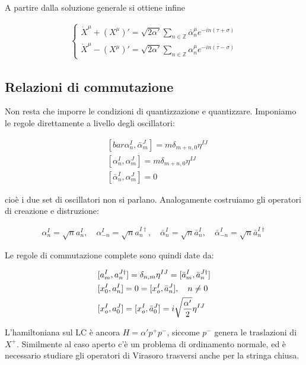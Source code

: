 \documentclass{report}
\begin{document}
A partire dalla soluzione generale si ottiene infine 

\begin{align}
    \begin{cases}
        \dot{X}^\mu + (X^\mu)' = \sqrt{2\alpha'}\sum_{n\in \mathbb{Z}}\bar{\alpha}_n^\mu e^{-in(\tau + \sigma)} \\ 
        \dot{X}^\mu - (X^\mu)' = \sqrt{2\alpha'}\sum_{n\in \mathbb{Z}}\alpha_n^\mu e^{-in(\tau - \sigma)}
    \end{cases}
\end{align}

\subsection{Relazioni di commutazione}

Non resta che imporre le condizioni di quantizzazione e quantizzare. Imponiamo le regole direttamente a livello degli oscillatori: 

\begin{align}
    &[bar{\alpha}_n^I, \bar{\alpha}_m^J] = m \delta_{m+n, 0}\eta^{IJ} \\
    &[\alpha_n^I, \alpha_m^J] = m \delta_{m+n, 0}\eta^{IJ} \\
    &[\bar{\alpha}_n^I, \alpha_m^J]  = 0  
\end{align}

cioè i due set di oscillatori non si parlano. Analogamente costruiamo gli operatori di creazione e distruzione: 

\begin{align}
    \alpha^I_n = \sqrt{n}a_n^I, \quad \alpha^I_{-n} = \sqrt{n}a_n^{I\dagger}, \quad \bar{\alpha}^I_n = \sqrt{n}\bar{a}_n^I, \quad \bar{\alpha}^I_{-n} = \sqrt{n}\bar{a}_n^{I\dagger}   
\end{align}

Le regole di commutazione complete sono quindi date da: 

\begin{align}
    &[a_m^I, a_n^{J\dagger}] = \delta_{n,m}\eta^{IJ} = [\bar{a}_m^I, \bar{a}_n^{J\dagger}] \notag \\ 
    &[x_0^I, a_n^I] = 0 = [x_o^I, \bar{a}_n^J], \quad n \neq 0 \notag \\ 
    &[x_o^I, a_0^J] = [x_o^I, \bar{a}_0^J] = i\sqrt{\frac{\alpha'}{2}}\eta^{IJ}
\end{align}

L'hamiltoniana sul LC è ancora \(H = \alpha' p^+ p^-\), siccome \(p^-\) genera le traslazioni di \(X^+\). Similmente al caso aperto c'è un problema di ordinamento normale, ed è necessario studiare gli operatori di Virasoro trasversi anche per la stringa chiusa. 
\end{document}

